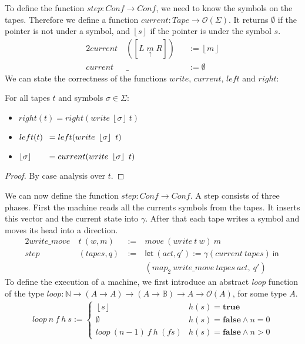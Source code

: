 \documentclass{psartcl}
\newcommand{\from}{:}
\renewcommand{\to}{\rightarrow}
\newcommand{\Opt}{\mathcal{O}}
\newcommand{\Bool}{\mathbb{B}}
\newcommand{\Nat}{\mathbb{N}}
\newcommand{\Some}[1]{\left\lfloor #1\right\rfloor}
\renewcommand{\None}{\emptyset}
\newcommand{\true}{\mathbf{true}}
\newcommand{\false}{\mathbf{false}}
\newcommand{\tape}[1]{[ #1 ]}
\newcommand{\tapePointer}[1]{\; \underset{\uparrow}{#1} \;}
\newcommand{\MS}[1]{\textsf{#1}}
\newcommand{\mlet}[2]{\MS{let}~#1~\MS{in}~#2}
\begin{document}
To define the function $step \from Conf \to Conf$, we need to know the symbols on the tapes.  Therefore we define a function
$current \from Tape \to \Opt(\Sigma)$.  It returns $\None$ if the pointer is not under a symbol, and $\Some s$ if the pointer is under the symbol $s$.
\begin{alignat*}{2}
  current&~(\tape{L \tapePointer{m} R})&&:= \Some m \\
  current&~\_                       &&:= \None
\end{alignat*}
We can state the correctness of the functions $write$, $current$, $left$ and $right$:
\begin{lemma}[Write]
  For all tapes $t$ and symbols $\sigma \in \Sigma$:
  \begin{itemize}
    \item $right(t)                     = right(write~\Some\sigma~t)$
    \item $left(t)      \hspace{0.5em}  = left(write~\Some\sigma~t)$
    \item $\Some\sigma  \hspace{1.9em}  = current(write~\Some\sigma~t)$
\end{itemize}
\end{lemma}
\begin{proof}
  By case analysis over $t$.
\end{proof}
We can now define the function $step \from Conf \to Conf$.  A step consists of three phases.  First the machine reads all the currents symbols from
the tapes.  It inserts this vector and the current state into $\gamma$.  After that each tape writes a symbol and moves its head into a direction.
\begin{alignat*}{2}
  write\_move&~t~(w, m)   &~:=~& move~(write~t~w)~m \\
  step       &~(tapes, q) &~:=~& \mlet{(act, q') := \gamma(current~tapes)}{ \\
             &            &~  ~& (map_2~write\_move~tapes~act,~q')}
\end{alignat*}
To define the execution of a machine, we first introduce an abstract \emph{loop} function of the type
$loop \from \Nat \to (A \to A) \to (A \to \Bool) \to A \to \Opt(A)$, for some type $A$.
\begin{align*}
  loop~n~f~h~s :=
  \begin{cases}
    \Some{s}              & h(s) = \true \\
    \None                 & h(s) = \false \land n = 0 \\
    loop~(n-1)~f~h~(f s)  & h(s) = \false \land n > 0
  \end{cases}
\end{align*}
\end{document}
